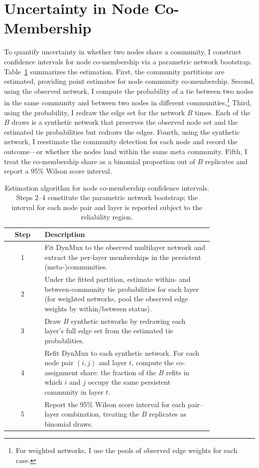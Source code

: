 \documentclass[11pt, letterpaper]{article}
\begin{document}
\section{Uncertainty in Node Co-Membership}\label{sec:uncertainty}
To quantify uncertainty in whether two nodes share a community, I construct confidence intervals for node co-membership via a parametric network bootstrap. Table~\ref{tab:ci_algorithm} summarizes the estimation. First, the community partitions are estimated, providing point estimates for node community co-membership. Second, using the observed network, I compute the probability of a tie between two nodes in the same community and between two nodes in different communities.\footnote{For weighted networks, I use the pools of observed edge weights for each case.} Third, using the probability, I redraw the edge set for the network $B$ times. Each of the $B$ draws is a synthetic network that preserves the observed node set and the estimated tie probabilities but redraws the edges. Fourth, using the synthetic network, I reestimate the community detection for each node and record the outcome---or whether the nodes land within the same meta community. Fifth, I treat the co-membership share as a binomial proportion out of $B$ replicates and report a 95\% Wilson score interval.

\begin{table}[t]
\footnotesize
\centering
\caption{Estimation algorithm for node co-membership confidence intervals.
Steps 2--4 constitute the parametric network bootstrap; the interval for each
node pair and layer is reported subject to the reliability region.}
\label{tab:ci_algorithm}
\begin{tabular}{cp{0.82\linewidth}}
\toprule
Step & Description \\
\midrule
1 & Fit DynMux to the observed multilayer network and extract the
    per-layer memberships in the persistent (meta-)communities. \\
2 & Under the fitted partition, estimate within- and between-community tie
    probabilities for each layer (for weighted networks, pool the observed
    edge weights by within/between status). \\
3 & Draw $B$ synthetic networks by redrawing each layer's full edge set from
    the estimated tie probabilities. \\
4 & Refit DynMux to each synthetic network. For each node pair $(i,j)$ and layer $t$, compute the co-assignment
    share: the fraction of the $B$ refits in which $i$ and $j$ occupy the
    same persistent community in layer $t$. \\
5 & Report the 95\% Wilson score interval for each pair--layer combination,
    treating the $B$ replicates as binomial draws. \\
\bottomrule
\end{tabular}
\end{table}
\end{document}
